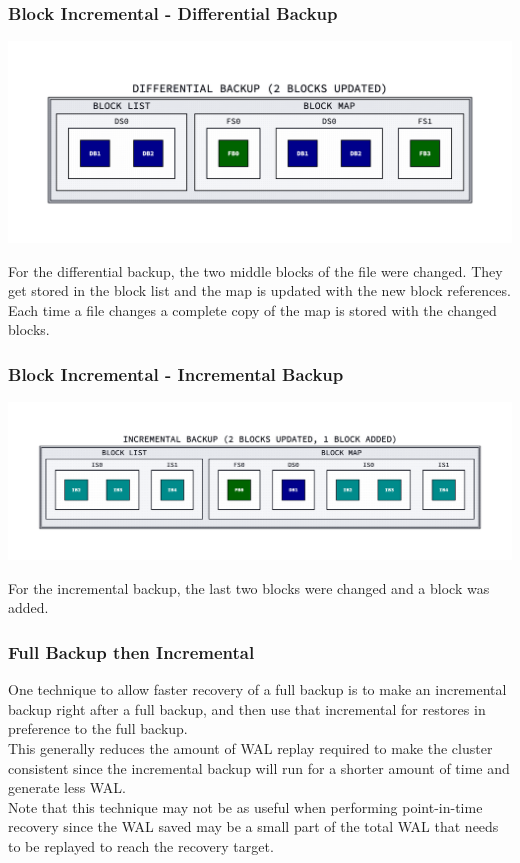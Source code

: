 \begin{frame}[fragile]
    \frametitle{Block Incremental - Differential Backup}

    \includegraphics[width=\linewidth]{svg/block-diff.png}

    For the differential backup, the two middle blocks of the file were changed. They get stored in the block list and the map is updated with the new block references. Each time a file changes a complete copy of the map is stored with the changed blocks.
\end{frame}

\begin{frame}[fragile]
    \frametitle{Block Incremental - Incremental Backup}

    \includegraphics[width=\linewidth]{svg/block-incr.png}

    For the incremental backup, the last two blocks were changed and a block was added.
\end{frame}

\begin{frame}[fragile]
    \frametitle{Full Backup then Incremental}

    One technique to allow faster recovery of a full backup is to make an incremental backup right after a full backup, and then use that incremental for restores in preference to the full backup.
    \\\vspace{1em}
    This generally reduces the amount of WAL replay required to make the cluster consistent since the incremental backup will run for a shorter amount of time and generate less WAL.
    \\\vspace{1em}
    Note that this technique may not be as useful when performing point-in-time recovery since the WAL saved may be a small part of the total WAL that needs to be replayed to reach the recovery target.
\end{frame}

